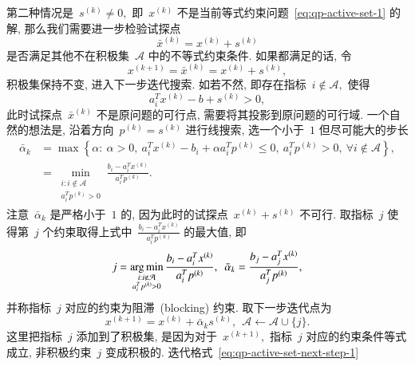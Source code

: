 第二种情况是~${s}^{(k)} \neq {0},$ 即~${x}^{(k)}$ 不是当前等式约束问题~\eqref{eq:qp-active-set-1} 的解, 那么我们需要进一步检验试探点
\begin{equation}
\label{eq:qp-active-set-test-point}
\bar{{x}}^{(k)} = {x}^{(k)} + {s}^{(k)}
\end{equation}
是否满足其他不在积极集~$\mathcal{A}$ 中的不等式约束条件. 如果都满足的话, 令
\begin{equation}
\label{eq:qp-active-set-next-step-1}
{x}^{(k+1)} = \bar{{x}}^{(k)} = {x}^{(k)} + {s}^{(k)},
\end{equation}
积极集保持不变, 进入下一步迭代搜索. 如若不然, 即存在指标~$i \not\in \mathcal{A},$ 使得
\begin{equation*}
{a}_i^T {x}^{(k)} - {b} + {s}^{(k)} > 0,
\end{equation*}
此时试探点~$\bar{{x}}^{(k)}$ 不是原问题的可行点, 需要将其投影到原问题的可行域.
一个自然的想法是, 沿着方向~${p}^{(k)} = {s}^{(k)}$ 进行线搜索, 选一个小于~$1$ 但尽可能大的步长
\begin{equation}
\label{eq:qp-active-set-step-len-1}
\begin{aligned}
\bar{\alpha}_k & = \max \left\{ \alpha : ~ \alpha > 0, ~ {a}_i^T {x}^{(k)} - b_i + \alpha {a}_i^T {p}^{(k)} \leqslant 0, ~ {a}_i^T {p}^{(k)} > 0, ~ \forall i \not\in \mathcal{A} \right\}, \\
& = \min_{\substack{i: i \not\in \mathcal{A} \\ {a}_i^T {p}^{(k)} > 0}} \frac{b_i - {a}_i^T {x}^{(k)}}{{a}_i^T {p}^{(k)}}.
\end{aligned}
\end{equation}
注意~$\bar{\alpha}_k$ 是严格小于~$1$ 的, 因为此时的试探点~${x}^{(k)} + {s}^{(k)}$ 不可行. 取指标~$j$ 使得第~$j$ 个约束取得上式中~$\frac{b_i - {a}_i^T {x}^{(k)}}{{a}_i^T {p}^{(k)}}$ 的最大值, 即
\begin{equation}
\label{eq:qp-active-set-step-len-2}
j = \operatorname*{arg\,min}_{\substack{i: i \not\in \mathcal{A} \\ {a}_i^T {p}^{(k)} > 0}} \frac{b_i - {a}_i^T {x}^{(k)}}{{a}_i^T {p}^{(k)}}, ~~ \bar{\alpha}_k = \frac{b_j - {a}_j^T {x}^{(k)}}{{a}_j^T {p}^{(k)}},
\end{equation}
并称指标~$j$ 对应的约束为阻滞~(blocking) 约束. 取下一步迭代点为
\begin{equation}
\label{eq:qp-active-set-next-step-2}
{x}^{(k+1)} = {x}^{(k)} + \bar{\alpha}_k {s}^{(k)}, ~~ \mathcal{A} \gets \mathcal{A} \cup \{ j \}.
\end{equation}
这里把指标~$j$ 添加到了积极集, 是因为对于~${x}^{(k+1)},$ 指标~$j$ 对应的约束条件等式成立, 非积极约束~$j$ 变成积极的. 迭代格式~\eqref{eq:qp-active-set-next-step-1}
